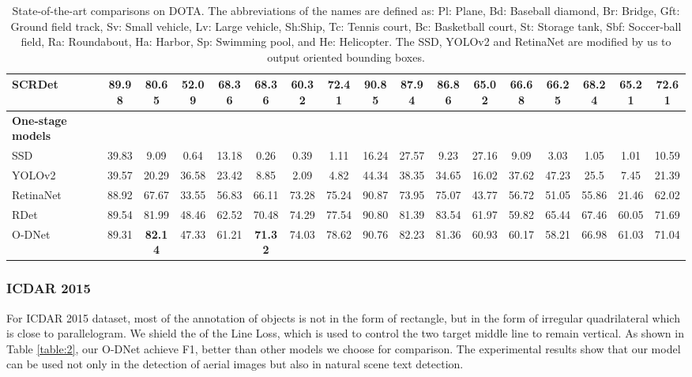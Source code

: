 \documentclass[runningheads]{llncs}
\begin{document}
\begin{table*}[!t]
{\begin{tabular}{l|c|c|c|c|c|c|c|c|c|c|c|c|c|c|c|c}
			SCRDet \cite{yang2019scrdet} & {\bf89.98} & 80.65 & {\bf52.09} & 68.36 & 68.36 & 60.32 & 72.41 & {\bf90.85} & {\bf87.94} & {\bf86.86} & 65.02 & {\bf66.68} & 66.25 & 68.24 & {\bf65.21} & {\bf72.61}\\
			\hline
			\textbf{One-stage models} & \multicolumn{16}{|c}{} \\
			\hline
			SSD \cite{liu2016ssd} & 39.83 & 9.09 & 0.64 & 13.18 & 0.26 & 0.39 & 1.11 & 16.24 & 27.57 & 9.23 & 27.16 & 9.09 & 3.03 & 1.05 & 1.01 & 10.59 \\
			YOLOv2 \cite{redmon2016you} & 39.57 & 20.29 & 36.58 & 23.42 & 8.85 & 2.09 & 4.82 & 44.34 & 38.35 & 34.65 & 16.02 & 37.62 & 47.23 & 25.5 & 7.45 & 21.39 \\
			RetinaNet \cite{lin2017focal} & 88.92 & 67.67 & 33.55 & 56.83 & 66.11 & 73.28 & 75.24 & 90.87 & 73.95 & 75.07 & 43.77 & 56.72 & 51.05 & 55.86 & 21.46 & 62.02 \\
			RDet \cite{yang2019r3det} & 89.54 & 81.99 & 48.46 & 62.52 & 70.48 & 74.29 & 77.54 & 90.80 & 81.39 & 83.54 & 61.97 & 59.82 & 65.44 & 67.46 & 60.05 & 71.69\\
			O-DNet  & 89.31 & {\bf82.14} & 47.33 & 61.21 & {\bf71.32} & 74.03 & 78.62 & 90.76 & 82.23 & 81.36 & 60.93 & 60.17 & 58.21 & 66.98 & 61.03 & 71.04\\
			\hline
	\end{tabular}}
	\vspace{10pt}
	
	\caption{State-of-the-art comparisons on DOTA.  The abbreviations of the names are defined as: Pl: Plane, Bd: Baseball diamond, Br: Bridge, Gft: Ground field track, Sv: Small vehicle, Lv: Large vehicle, Sh:Ship, Tc: Tennis court, Bc: Basketball court, St: Storage tank, Sbf: Soccer-ball field, Ra: Roundabout, Ha: Harbor, Sp: Swimming pool, and He: Helicopter. The SSD, YOLOv2 and RetinaNet are modified by us to output oriented bounding boxes.}
	\label{table:1}
\end{table*}


\subsubsection{ICDAR 2015}

For ICDAR 2015 dataset, most of the annotation of objects is not in the form of rectangle, but in the form of irregular quadrilateral which is close to parallelogram. We shield the  of the Line Loss, which is used to control the two target middle line to remain vertical. As shown in Table \ref{table:2}, our O-DNet achieve  F1, better than other models we choose for comparison. The experimental results show that our model can be used not only in the detection of aerial images but also in natural scene text detection.
\end{document}
